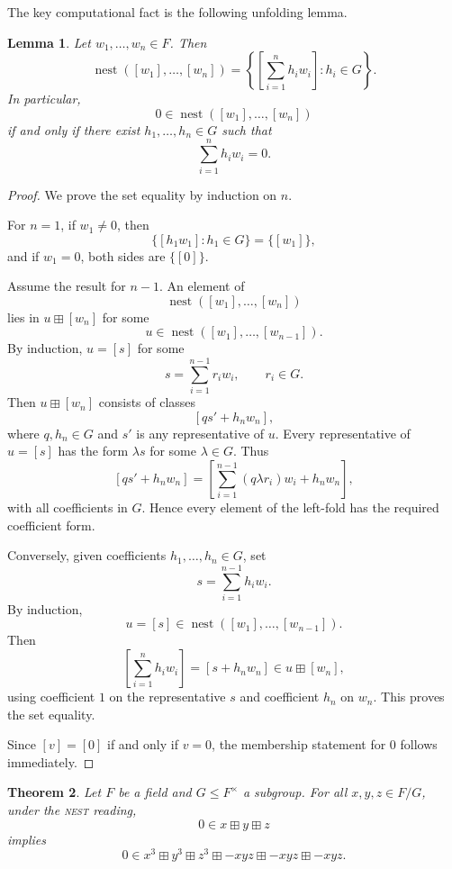 \documentclass[12pt]{article}
\newtheorem{theorem}{Theorem}[section]
\newtheorem{lemma}[theorem]{Lemma}
\theoremstyle{definition}
\theoremstyle{remark}
\numberwithin{equation}{section}
\newcommand{\nest}{\operatorname{nest}}
\begin{document}
The key computational fact is the following unfolding lemma.

\begin{lemma}\label{lem:quotient-unfolding}
Let \(w_1,\dots,w_n\in F\). Then
\[
\nest([w_1],\dots,[w_n])
=
\left\{
\left[\sum_{i=1}^n h_i w_i\right]:h_i\in G
\right\}.
\]
In particular,
\[
0\in\nest([w_1],\dots,[w_n])
\]
if and only if there exist \(h_1,\dots,h_n\in G\) such that
\[
\sum_{i=1}^n h_i w_i=0.
\]
\end{lemma}

\begin{proof}
We prove the set equality by induction on \(n\).

For \(n=1\), if \(w_1\neq0\), then
\[
\{[h_1w_1]:h_1\in G\}=\{[w_1]\},
\]
and if \(w_1=0\), both sides are \(\{[0]\}\).

Assume the result for \(n-1\). An element of
\[
\nest([w_1],\dots,[w_n])
\]
lies in \(u\boxplus[w_n]\) for some
\[
u\in\nest([w_1],\dots,[w_{n-1}]).
\]
By induction, \(u=[s]\) for some
\[
s=\sum_{i=1}^{n-1} r_iw_i,\qquad r_i\in G.
\]
Then \(u\boxplus[w_n]\) consists of classes
\[
[q s' + h_n w_n],
\]
where \(q,h_n\in G\) and \(s'\) is any representative of \(u\). Every representative of \(u=[s]\) has the form \(\lambda s\) for some \(\lambda\in G\). Thus
\[
[q s'+h_nw_n]
=
\left[\sum_{i=1}^{n-1} (q\lambda r_i)w_i+h_nw_n\right],
\]
with all coefficients in \(G\). Hence every element of the left-fold has the required coefficient form.

Conversely, given coefficients \(h_1,\dots,h_n\in G\), set
\[
s=\sum_{i=1}^{n-1}h_iw_i.
\]
By induction,
\[
u=[s]\in\nest([w_1],\dots,[w_{n-1}]).
\]
Then
\[
\left[\sum_{i=1}^n h_iw_i\right]
=
[s+h_nw_n]
\in u\boxplus[w_n],
\]
using coefficient \(1\) on the representative \(s\) and coefficient \(h_n\) on \(w_n\). This proves the set equality.

Since \([v]=[0]\) if and only if \(v=0\), the membership statement for \(0\) follows immediately.
\end{proof}

\begin{theorem}\label{thm:quotient}
Let \(F\) be a field and \(G\le F^\times\) a subgroup. For all \(x,y,z\in F/G\), under the \textsc{nest} reading,
\[
0\in x\boxplus y\boxplus z
\]
implies
\[
0\in x^3\boxplus y^3\boxplus z^3\boxplus -xyz\boxplus -xyz\boxplus -xyz.
\]
\end{theorem}
\end{document}
